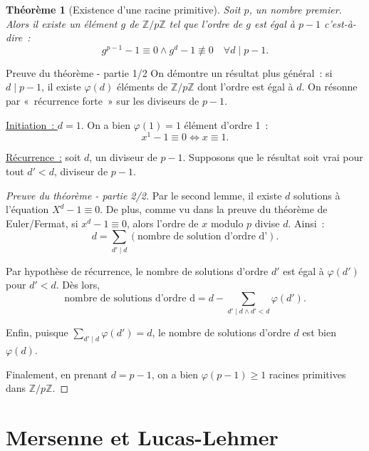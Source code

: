 \documentclass[10pt, mathserif]{beamer}
\newcommand{\Z}{\mathbb Z}
\newtheorem{thm}{Théorème}[section]
\theoremstyle{definition}
\theoremstyle{remark}
\begin{document}
	\begin{frame}
		\begin{thm}[Existence d'une racine primitive]
			Soit $p$, un nombre premier. Alors il existe un élément $g$ de $\Z/p\Z$ tel que l'ordre de $g$ est égal à $p-1$ c'est-à-dire~:
			\[g^{p-1}-1 \equiv 0 \land g^{d}-1 \not \equiv 0 \quad \forall d \mid p-1.\]
		\end{thm}

		\begin{block}{Preuve du théorème - partie 1/2}
			 On démontre un résultat plus général~: si $d \mid p-1$, il existe $\varphi(d)$ éléments de $\Z/p\Z$ dont l'ordre est égal à $d$. On résonne par
			 «~récurrence forte~» sur les diviseurs de $p-1$.
			 
			 \underline{Initiation~: $d = 1$}. On a bien $\varphi(1) = 1$ élément d'ordre 1~:
			 \[x^1 - 1 \equiv 0 \iff x \equiv 1.\]
			 
			 \underline{Récurrence~:} soit $d$, un diviseur de $p-1$. Supposons que le résultat soit vrai pour tout $d' < d$, diviseur de $p-1$.
		\end{block}
	\end{frame}

	\begin{frame}
		\begin{proof}[Preuve du théorème - partie 2/2]
			Par le second lemme, il existe $d$ solutions à l'équation $X^d-1\equiv 0$. De plus, comme vu dans la preuve du théorème de Euler/Fermat,
			si $x^d - 1 \equiv 0$, alors l'ordre de $x$ modulo $p$ divise $d$. Ainsi~:
			\[d = \sum_{d'\mid d}\left(\text{nombre de solution d'ordre d'}\right).\]
			
			Par hypothèse de récurrence, le nombre de solutions d'ordre $d'$ est égal à $\varphi(d')$ pour $d' < d$. Dès lors,
			\[\text{nombre de solutions d'ordre d} = d - \sum_{d' \mid d \land d' < d}\varphi(d').\]

			Enfin, puisque $\sum_{d'\mid d}\varphi(d') = d$, le nombre de solutions d'ordre $d$ est bien $\varphi(d)$.
			
			Finalement, en prenant $d = p-1$, on a bien $\varphi(p-1) \ge 1$ racines primitives dans $\Z/p\Z$.
		\end{proof}
	\end{frame}

\section{Mersenne et Lucas-Lehmer}
\end{document}
